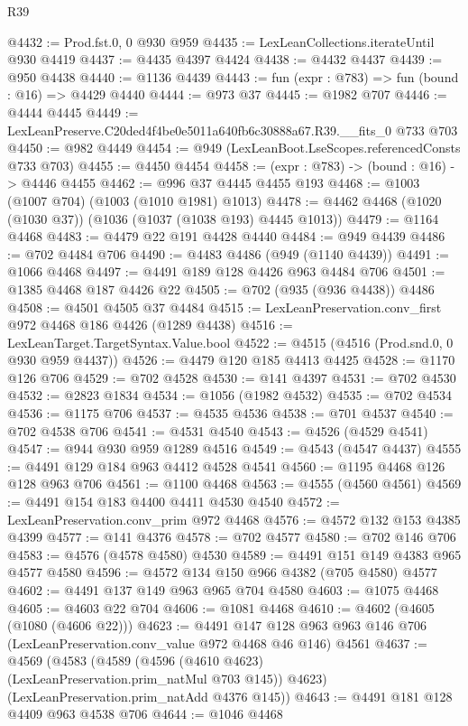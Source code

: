 \begin{lexlean}{R39}
\begin{coremodule}
@4432 := Prod.fst.{0, 0} @930 @959
@4435 := LexLeanCollections.iterateUntil @930 @4419
@4437 := @4435 @4397 @4424
@4438 := @4432 @4437
@4439 := @950 @4438
@4440 := @1136 @4439
@4443 := fun (expr : @783) => fun (bound : @16) => @4429 @4440
@4444 := @973 @37
@4445 := @1982 @707
@4446 := @4444 @4445
@4449 := LexLeanPreserve.C20ded4f4be0e5011a640fb6c30888a67.R39.__fits_0 @733 @703
@4450 := @982 @4449
@4454 := @949 (LexLeanBoot.LseScopes.referencedConsts @733 @703)
@4455 := @4450 @4454
@4458 := (expr : @783) -> (bound : @16) -> @4446 @4455
@4462 := @996 @37 @4445 @4455 @193
@4468 := @1003 (@1007 @704) (@1003 (@1010 @1981) @1013)
@4478 := @4462 @4468 (@1020 (@1030 @37)) (@1036 (@1037 (@1038 @193) @4445 @1013))
@4479 := @1164 @4468
@4483 := @4479 @22 @191 @4428 @4440
@4484 := @949 @4439
@4486 := @702 @4484 @706
@4490 := @4483 @4486 (@949 (@1140 @4439))
@4491 := @1066 @4468
@4497 := @4491 @189 @128 @4426 @963 @4484 @706
@4501 := @1385 @4468 @187 @4426 @22
@4505 := @702 (@935 (@936 @4438)) @4486
@4508 := @4501 @4505 @37 @4484
@4515 := LexLeanPreservation.conv_first @972 @4468 @186 @4426 (@1289 @4438)
@4516 := LexLeanTarget.TargetSyntax.Value.bool
@4522 := @4515 (@4516 (Prod.snd.{0, 0} @930 @959 @4437))
@4526 := @4479 @120 @185 @4413 @4425
@4528 := @1170 @126 @706
@4529 := @702 @4528
@4530 := @141 @4397
@4531 := @702 @4530
@4532 := @2823 @1834
@4534 := @1056 (@1982 @4532)
@4535 := @702 @4534
@4536 := @1175 @706
@4537 := @4535 @4536
@4538 := @701 @4537
@4540 := @702 @4538 @706
@4541 := @4531 @4540
@4543 := @4526 (@4529 @4541)
@4547 := @944 @930 @959 @1289 @4516
@4549 := @4543 (@4547 @4437)
@4555 := @4491 @129 @184 @963 @4412 @4528 @4541
@4560 := @1195 @4468 @126 @128 @963 @706
@4561 := @1100 @4468
@4563 := @4555 (@4560 @4561)
@4569 := @4491 @154 @183 @4400 @4411 @4530 @4540
@4572 := LexLeanPreservation.conv_prim @972 @4468
@4576 := @4572 @132 @153 @4385 @4399
@4577 := @141 @4376
@4578 := @702 @4577
@4580 := @702 @146 @706
@4583 := @4576 (@4578 @4580) @4530
@4589 := @4491 @151 @149 @4383 @965 @4577 @4580
@4596 := @4572 @134 @150 @966 @4382 (@705 @4580) @4577
@4602 := @4491 @137 @149 @963 @965 @704 @4580
@4603 := @1075 @4468
@4605 := @4603 @22 @704
@4606 := @1081 @4468
@4610 := @4602 (@4605 (@1080 (@4606 @22)))
@4623 := @4491
    @147
    @128
    @963
    @963
    @146
    @706
    (LexLeanPreservation.conv_value @972 @4468 @46 @146)
    @4561
@4637 := @4569
    (@4583
      (@4589 (@4596 (@4610 @4623) (LexLeanPreservation.prim_natMul @703 @145)) @4623)
      (LexLeanPreservation.prim_natAdd @4376 @145))
@4643 := @4491 @181 @128 @4409 @963 @4538 @706
@4644 := @1046 @4468

\end{coremodule}
\end{lexlean}
